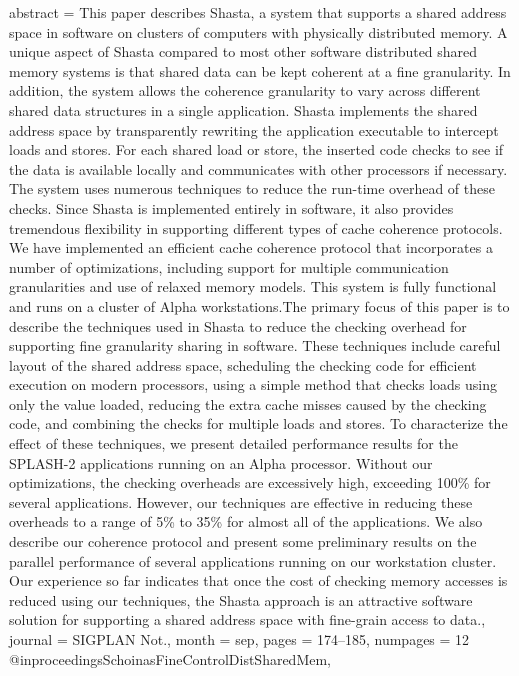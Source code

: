 {{abstract = {This paper describes Shasta, a system that supports a shared address space in software on clusters of computers with physically distributed memory. A unique aspect of Shasta compared to most other software distributed shared memory systems is that shared data can be kept coherent at a fine granularity. In addition, the system allows the coherence granularity to vary across different shared data structures in a single application. Shasta implements the shared address space by transparently rewriting the application executable to intercept loads and stores. For each shared load or store, the inserted code checks to see if the data is available locally and communicates with other processors if necessary. The system uses numerous techniques to reduce the run-time overhead of these checks. Since Shasta is implemented entirely in software, it also provides tremendous flexibility in supporting different types of cache coherence protocols. We have implemented an efficient cache coherence protocol that incorporates a number of optimizations, including support for multiple communication granularities and use of relaxed memory models. This system is fully functional and runs on a cluster of Alpha workstations.The primary focus of this paper is to describe the techniques used in Shasta to reduce the checking overhead for supporting fine granularity sharing in software. These techniques include careful layout of the shared address space, scheduling the checking code for efficient execution on modern processors, using a simple method that checks loads using only the value loaded, reducing the extra cache misses caused by the checking code, and combining the checks for multiple loads and stores. To characterize the effect of these techniques, we present detailed performance results for the SPLASH-2 applications running on an Alpha processor. Without our optimizations, the checking overheads are excessively high, exceeding 100\% for several applications. However, our techniques are effective in reducing these overheads to a range of 5\% to 35\% for almost all of the applications. We also describe our coherence protocol and present some preliminary results on the parallel performance of several applications running on our workstation cluster. Our experience so far indicates that once the cost of checking memory accesses is reduced using our techniques, the Shasta approach is an attractive software solution for supporting a shared address space with fine-grain access to data.},
journal = {SIGPLAN Not.},
month = {sep},
pages = {174–185},
numpages = {12}
}
@inproceedings{SchoinasFineControlDistSharedMem,
}}
